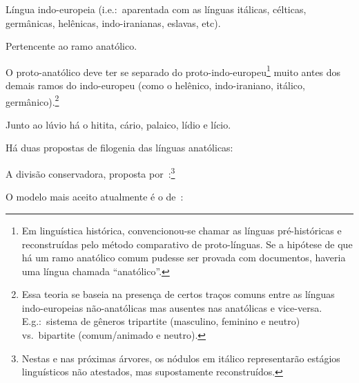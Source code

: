 \documentclass[article]{lúvio}
\begin{document}
\begin{compactitem}
	\item Língua indo-europeia (i.e.:\ aparentada com as línguas itálicas,
	célticas, germânicas, helênicas, indo-iranianas, eslavas, etc).
	\item Pertencente ao ramo anatólico.
	\begin{compactitem}
		\item O proto\hyp{}anatólico deve ter se separado do
		proto\hyp{}indo\hyp{}europeu\footnote{Em linguística histórica,
			convencionou-se chamar as línguas pré\hyp{}históricas e reconstruídas pelo
			método comparativo de proto\hyp{}línguas. Se a hipótese de que há um ramo
			anatólico comum pudesse ser provada com documentos, haveria uma língua chamada
			``anatólico''.}
		muito antes dos demais ramos do indo\hyp{}europeu (como o helênico,
		indo\hyp{}iraniano, itálico, germânico).\footnote{Essa teoria se baseia na
			presença de certos traços comuns entre as línguas indo\hyp{}europeias
			não\hyp{}anatólicas mas ausentes nas anatólicas e vice\hyp{}versa. E.g.:\ sistema de
			gêneros tripartite (masculino, feminino e neutro) vs.\ bipartite
			(comum\slash{}animado e neutro).}
		\item Junto ao lúvio há o hitita, cário, palaico, lídio e lício.
		\item Há duas propostas de filogenia das línguas anatólicas:
		\begin{compactitem}
			\item A divisão conservadora,  proposta por~\textcite[pp. 305f.]{Rieken2017}:\footnote{Nestas e nas
				próximas árvores, os nódulos em itálico representarão estágios linguísticos
				não atestados, mas supostamente reconstruídos.}
			\begin{center}
			\end{center}
			\item O modelo mais aceito atualmente é o de~\textcite[92]{Oettinger1978}:
			\begin{center}
			\end{center}
		\end{compactitem}
	\end{compactitem}
\end{compactitem}
\end{document}
